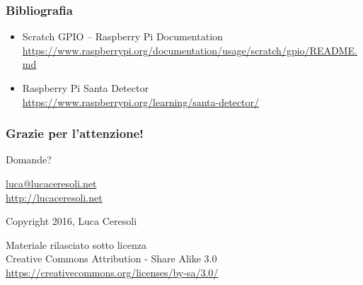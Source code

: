 \documentclass[xetex,table]{beamer}
\begin{document}
\begin{frame}
  \frametitle{Bibliografia}
  \begin{itemize}
  \item Scratch GPIO -- Raspberry Pi Documentation\\
    {\tiny\url{https://www.raspberrypi.org/documentation/usage/scratch/gpio/README.md}}
  \item Raspberry Pi Santa Detector\\
    {\tiny\url{https://www.raspberrypi.org/learning/santa-detector/}}
  \end{itemize}
\end{frame}

\begin{frame}
  \frametitle{Grazie per l'attenzione!}

  \begin{center}
    {\Huge Domande?}

    \vspace{0.1\textheight}

    \href{mailto:luca@lucaceresoli.net}{luca@lucaceresoli.net}\\
    \url{http://lucaceresoli.net}

    \textcopyright{} Copyright 2016, Luca Ceresoli\\

    \vspace{0.2\textheight}

    \tiny
    Materiale rilasciato sotto licenza\\
    Creative Commons Attribution - Share Alike 3.0 \\
    \url{https://creativecommons.org/licenses/by-sa/3.0/} \\
\end{center}
\end{frame}
\end{document}
